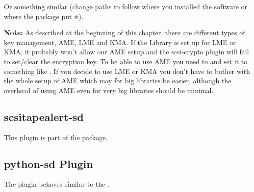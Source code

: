 Or something similar (change paths to follow where you installed the software or where the package put it).

\textbf{Note:} As described at the beginning of this chapter, there are different types of key management, AME, LME and KMA. If the Library is set up for LME or KMA, it probably won't allow our AME setup and the scsi-crypto plugin will fail to set/clear the encryption key. To be able to use AME you need to  and set it to something like .
If you decide to use LME or KMA you don't have to bother with the whole setup of AME which may for big libraries be easier, although the overhead of using AME even for very big libraries should be minimal.

\subsection{scsitapealert-sd}

This plugin is part of the  package.


\subsection{python-sd Plugin}

The  plugin behaves similar to the .
